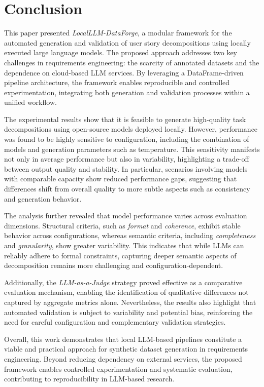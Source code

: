 \documentclass[pdflatex,sn-mathphys-num]{sn-jnl}%
\theoremstyle{thmstyleone}%
\theoremstyle{thmstyletwo}%
\theoremstyle{thmstylethree}%
\begin{document}
\section{Conclusion}\label{sec6}

This paper presented \textit{LocalLLM-DataForge}, a modular framework for the automated generation and validation of user story decompositions using locally executed large language models. The proposed approach addresses two key challenges in requirements engineering: the scarcity of annotated datasets and the dependence on cloud-based LLM services. By leveraging a DataFrame-driven pipeline architecture, the framework enables reproducible and controlled experimentation, integrating both generation and validation processes within a unified workflow.

The experimental results show that it is feasible to generate high-quality task decompositions using open-source models deployed locally. However, performance was found to be highly sensitive to configuration, including the combination of models and generation parameters such as temperature. This sensitivity manifests not only in average performance but also in variability, highlighting a trade-off between output quality and stability. In particular, scenarios involving models with comparable capacity show reduced performance gaps, suggesting that differences shift from overall quality to more subtle aspects such as consistency and generation behavior.

The analysis further revealed that model performance varies across evaluation dimensions. Structural criteria, such as \textit{format} and \textit{coherence}, exhibit stable behavior across configurations, whereas semantic criteria, including \textit{completeness} and \textit{granularity}, show greater variability. This indicates that while LLMs can reliably adhere to formal constraints, capturing deeper semantic aspects of decomposition remains more challenging and configuration-dependent.

Additionally, the \textit{LLM-as-a-Judge} strategy proved effective as a comparative evaluation mechanism, enabling the identification of qualitative differences not captured by aggregate metrics alone. Nevertheless, the results also highlight that automated validation is subject to variability and potential bias, reinforcing the need for careful configuration and complementary validation strategies.

Overall, this work demonstrates that local LLM-based pipelines constitute a viable and practical approach for synthetic dataset generation in requirements engineering. Beyond reducing dependency on external services, the proposed framework enables controlled experimentation and systematic evaluation, contributing to reproducibility in LLM-based research.
\end{document}
